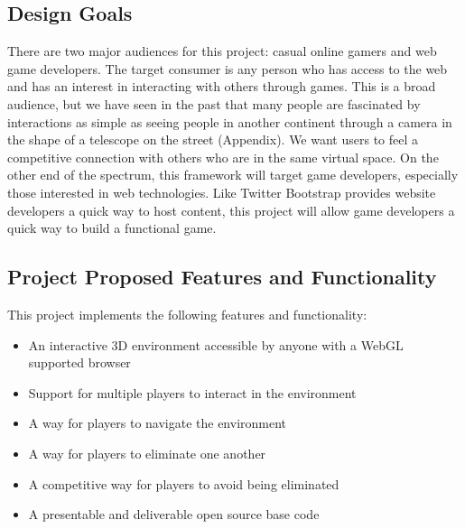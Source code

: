 \documentclass{acmsiggraph}
\begin{document}
    \subsection{Design Goals}
    There are two major audiences for this project: casual online gamers and web game developers. The target consumer is any person who has access to the web and has an interest in interacting with others through games. This is a broad audience, but we have seen in the past that many people are fascinated by interactions as simple as seeing people in another continent through a camera in the shape of a telescope on the street (Appendix). We want users to feel a competitive connection with others who are in the same virtual space. On the other end of the spectrum, this framework will target game developers, especially those interested in web technologies. Like Twitter Bootstrap provides website developers a quick way to host content, this project will allow game developers a quick way to build a functional game.

    \subsection{Project Proposed Features and Functionality}
    This project implements the following features and functionality:
    \begin{itemize}
        \item{An interactive 3D environment accessible by anyone with a WebGL supported browser}
        \item{Support for multiple players to interact in the environment}
        \item{A way for players to navigate the environment}
        \item{A way for players to eliminate one another}
        \item{A competitive way for players to avoid being eliminated}
        \item{A presentable and deliverable open source base code}
    \end{itemize}
\end{document}
